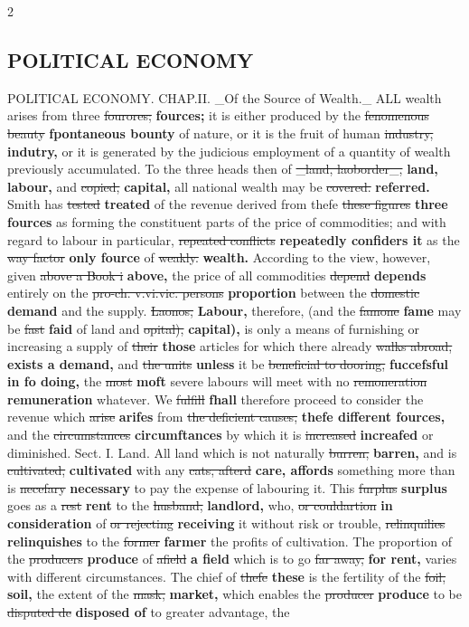 \documentclass[10pt]{article}
\begin{document}
\begin{multicols}{2}
\subsection*{POLITICAL ECONOMY}
POLITICAL ECONOMY. CHAP.II. \_Of the Source of Wealth.\_ ALL wealth arises from three \sout{fourores;} \textbf{fources;} it is either produced by the \sout{fenomenous beauty} \textbf{fpontaneous bounty} of nature, or it is the fruit of human \sout{industry,} \textbf{indutry,} or it is generated by the judicious employment of a quantity of wealth previously accumulated. To the three heads then of \sout{\_land, laoborder\_,} \textbf{land, labour,} and \sout{copied,} \textbf{capital,} all national wealth may be \sout{covered.} \textbf{referred.} Smith has \sout{tested} \textbf{treated} of the revenue derived from thefe \sout{these figures} \textbf{three fources} as forming the constituent parts of the price of commodities; and with regard to labour in particular, \sout{repeated conflicts} \textbf{repeatedly confiders it} as the \sout{way factor} \textbf{only fource} of \sout{weakly.} \textbf{wealth.} According to the view, however, given \sout{above a Book i} \textbf{above,} the price of all commodities \sout{depend} \textbf{depends} entirely on the \sout{pro-ch. v.vi.vic. persons} \textbf{proportion} between the \sout{domestic} \textbf{demand} and the supply. \sout{Laonos,} \textbf{Labour,} therefore, (and the \sout{famone} \textbf{fame} may be \sout{fast} \textbf{faid} of land and \sout{opital),} \textbf{capital),} is only a means of furnishing or increasing a supply of \sout{their} \textbf{those} articles for which there already \sout{walks abroad,} \textbf{exists a demand,} and \sout{the units} \textbf{unless} it be \sout{beneficial to dooring,} \textbf{fuccefsful in fo doing,} the \sout{most} \textbf{moft} severe labours will meet with no \sout{remoneration} \textbf{remuneration} whatever. We \sout{fulfill} \textbf{fhall} therefore proceed to consider the revenue which \sout{arise} \textbf{arifes} from \sout{the deficient causes,} \textbf{thefe different fources,} and the \sout{circumstances} \textbf{circumftances} by which it is \sout{increased} \textbf{increafed} or diminished. Sect. I. Land. All land which is not naturally \sout{burren,} \textbf{barren,} and is \sout{cultivated,} \textbf{cultivated} with any \sout{cats, afterd} \textbf{care, affords} something more than is \sout{necefary} \textbf{necessary} to pay the expense of labouring it. This \sout{furplus} \textbf{surplus} goes as a \sout{rest} \textbf{rent} to the \sout{husband,} \textbf{landlord,} who, \sout{or couldartion} \textbf{in consideration} of \sout{or rejecting} \textbf{receiving} it without risk or trouble, \sout{relinquilies} \textbf{relinquishes} to the \sout{former} \textbf{farmer} the profits of cultivation. The proportion of the \sout{producers} \textbf{produce} of \sout{afield} \textbf{a field} which is to go \sout{far away,} \textbf{for rent,} varies with different circumstances. The chief of \sout{thefe} \textbf{these} is the fertility of the \sout{foil,} \textbf{soil,} the extent of the \sout{mask,} \textbf{market,} which enables the \sout{producer} \textbf{produce} to be \sout{disputed de} \textbf{disposed of} to greater advantage, the 
\end{multicols}
\end{document}
